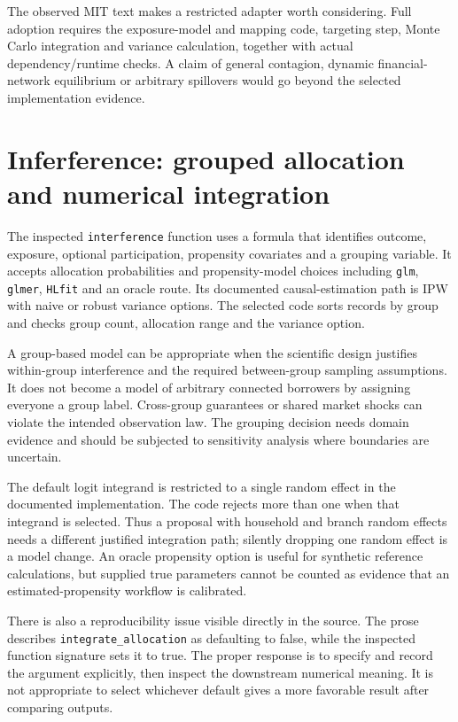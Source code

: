 The observed MIT text makes a restricted adapter worth considering. Full adoption
requires the exposure-model and mapping code, targeting step, Monte Carlo
integration and variance calculation, together with actual dependency/runtime
checks. A claim of general contagion, dynamic financial-network equilibrium or
arbitrary spillovers would go beyond the selected implementation evidence.

\section{Inferference: grouped allocation and numerical integration}

The inspected \texttt{interference} function uses a formula that identifies
outcome, exposure, optional participation, propensity covariates and a grouping
variable. It accepts allocation probabilities and propensity-model choices
including \texttt{glm}, \texttt{glmer}, \texttt{HLfit} and an oracle route.
Its documented causal-estimation path is IPW with naive or robust variance
options. The selected code sorts records by group and checks group count,
allocation range and the variance option.\cite{v13_sw_inferference}

A group-based model can be appropriate when the scientific design justifies
within-group interference and the required between-group sampling assumptions.
It does not become a model of arbitrary connected borrowers by assigning
everyone a group label. Cross-group guarantees or shared market shocks can
violate the intended observation law. The grouping decision needs domain
evidence and should be subjected to sensitivity analysis where boundaries
are uncertain.

The default logit integrand is restricted to a single random effect in the
documented implementation. The code rejects more than one when that integrand
is selected. Thus a proposal with household and branch random effects needs a
different justified integration path; silently dropping one random effect is
a model change. An oracle propensity option is useful for synthetic reference
calculations, but supplied true parameters cannot be counted as evidence that
an estimated-propensity workflow is calibrated.

There is also a reproducibility issue visible directly in the source. The prose
describes \texttt{integrate\_allocation} as defaulting to false, while the
inspected function signature sets it to true. The proper response is to specify
and record the argument explicitly, then inspect the downstream numerical
meaning. It is not appropriate to select whichever default gives a more
favorable result after comparing outputs.\cite{v13_sw_inferference}

